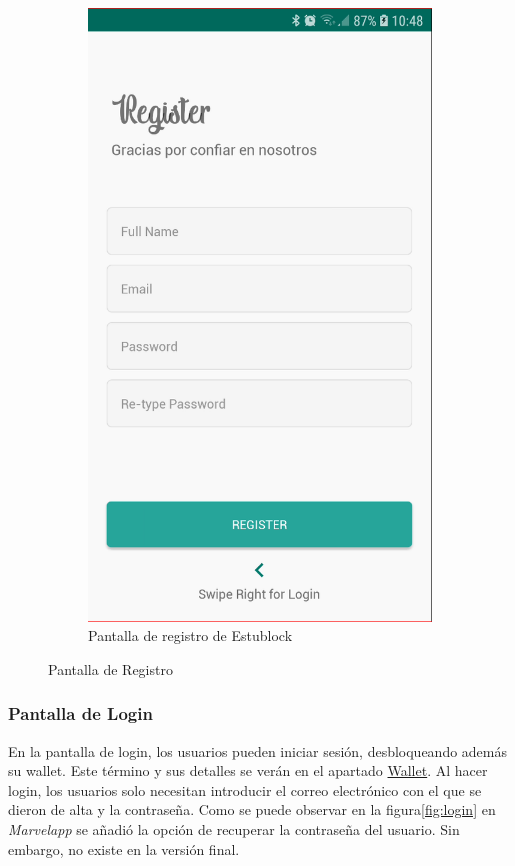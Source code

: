 \begin{figure}[hbt]
\begin{subfigure}[b]{0.4\linewidth}
        \includegraphics[width=0.7\linewidth]{figs/Desarrollo/Interfaz/estublock_registro}
        \caption[Estublock Registro]{Pantalla de registro de Estublock}
	\end{subfigure} 
	\caption[Pantalla de Registro]{Pantalla de Registro}
	\label{fig:pantalla_registro}
\end{figure}

\subsubsection{Pantalla de Login}

En la pantalla de login, los usuarios pueden iniciar sesión, desbloqueando además su wallet. Este término y sus detalles se verán en el apartado \hyperref[sec:wallet]{Wallet}. Al hacer login, los usuarios solo necesitan introducir el correo electrónico con el que se dieron de alta y la contraseña. Como se puede observar en la figura\ref{fig:login} en \emph{Marvelapp} se añadió la opción de recuperar la contraseña del usuario. Sin embargo, no existe en la versión final. \\

